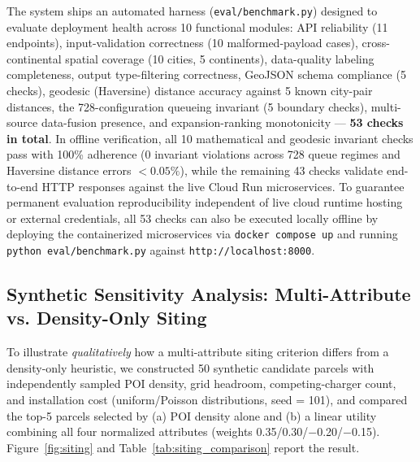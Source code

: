 \documentclass[preprint,12pt,authoryear]{elsarticle}
\begin{document}
The system ships an automated harness (\texttt{eval/benchmark.py}) designed to evaluate deployment health across 10 functional modules: API reliability (11 endpoints), input-validation correctness (10 malformed-payload cases), cross-continental spatial coverage (10 cities, 5 continents), data-quality labeling completeness, output type-filtering correctness, GeoJSON schema compliance (5 checks), geodesic (Haversine) distance accuracy against 5 known city-pair distances, the 728-configuration queueing invariant (5 boundary checks), multi-source data-fusion presence, and expansion-ranking monotonicity --- \textbf{53 checks in total}. In offline verification, all 10 mathematical and geodesic invariant checks pass with 100\% adherence (0 invariant violations across 728 queue regimes and Haversine distance errors $<0.05\%$), while the remaining 43 checks validate end-to-end HTTP responses against the live Cloud Run microservices. To guarantee permanent evaluation reproducibility independent of live cloud runtime hosting or external credentials, all 53 checks can also be executed locally offline by deploying the containerized microservices via \texttt{docker compose up} and running \texttt{python eval/benchmark.py} against \texttt{http://localhost:8000}.

\subsection{Synthetic Sensitivity Analysis: Multi-Attribute vs. Density-Only Siting}
\label{sec:siting}
To illustrate \emph{qualitatively} how a multi-attribute siting criterion differs from a density-only heuristic, we constructed 50 synthetic candidate parcels with independently sampled POI density, grid headroom, competing-charger count, and installation cost (uniform/Poisson distributions, seed = 101), and compared the top-5 parcels selected by (a) POI density alone and (b) a linear utility combining all four normalized attributes (weights 0.35/0.30/$-$0.20/$-$0.15). Figure~\ref{fig:siting} and Table~\ref{tab:siting_comparison} report the result.

\begin{table}[htbp]
\centering
\caption{Synthetic sensitivity analysis (not a field study): comparative performance on spatial siting viability metrics over synthetic candidate parcels.}
\label{tab:siting_comparison}
\end{table}
\end{document}
